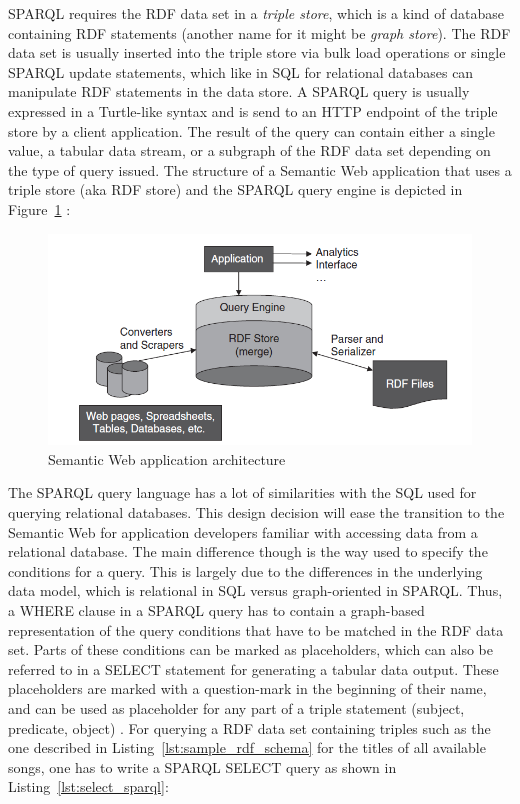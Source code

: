 \gls{SPARQL} requires the \gls{RDF} data set in a \emph{triple store}, which is a kind of database containing \gls{RDF} statements (another name for it might be \emph{graph store}). The \gls{RDF} data set is usually inserted into the triple store via bulk load operations or single \gls{SPARQL} update statements, which like in \gls{SQL} for relational databases can manipulate \gls{RDF} statements in the data store. A \gls{SPARQL} query is usually expressed in a Turtle-like syntax and is send to an \gls{HTTP} endpoint of the triple store by a client application. The result of the query can contain either a single value, a tabular data stream, or a subgraph of the \gls{RDF} data set depending on the type of query issued. The structure of a Semantic Web application that uses a triple store (aka \gls{RDF} store) and the \gls{SPARQL} query engine is depicted in Figure~\ref{fig:images_semweb_app} \citep[pg. 51-60]{allemang2011semantic}:

\begin{figure}[H]
	\centering
	\includegraphics[width=0.9\columnwidth]{images/semantic_web_application.png}
	\caption[Semantic Web application architecture]{Semantic Web application architecture \citep[pg. 57]{allemang2011semantic}}
	\label{fig:images_semweb_app}
\end{figure}

The \gls{SPARQL} query language has a lot of similarities with the \gls{SQL} used for querying relational databases. This design decision will ease the transition to the Semantic Web for application developers familiar with accessing data from a relational database. The main difference though is the way used to specify the conditions for a query. This is largely due to the differences in the underlying data model, which is relational in \gls{SQL} versus graph-oriented in \gls{SPARQL}. Thus, a WHERE clause in a \gls{SPARQL} query has to contain a graph-based representation of the query conditions that have to be matched in the \gls{RDF} data set. Parts of these conditions can be marked as placeholders, which can also be referred to in a SELECT statement for generating a tabular data output. These placeholders are marked with a question-mark in the beginning of their name, and can be used as placeholder for any part of a triple statement (subject, predicate, object) \citep[pg. 66-112]{allemang2011semantic}. For querying a \gls{RDF} data set containing triples such as the one described in Listing~\ref{lst:sample_rdf_schema} for the titles of all available songs, one has to write a \gls{SPARQL} SELECT query as shown in Listing~\ref{lst:select_sparql}: \@

